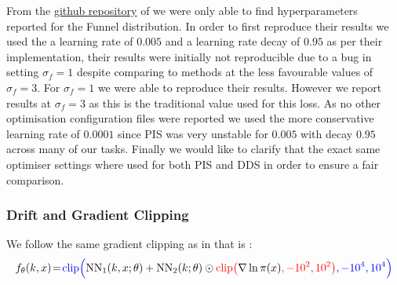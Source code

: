 \documentclass{article} %
\begin{document}
From the \href{https://github.com/qsh-zh/pis}{github repository} of \cite{zhangyongxinchen2021path} we were only able to find hyperparameters reported for the Funnel distribution. In order to first reproduce their results we used the a learning rate of $0.005$ and a learning rate decay of $0.95$ as per their implementation, their results were initially not reproducible due to a bug in setting $\sigma_f=1$ despite comparing to methods at the less favourable values of $\sigma_f=3$. For $\sigma_f=1$ we were able to reproduce their results. However we report results at $\sigma_f=3$ as this is the traditional value used for this loss. As no other optimisation configuration files were reported we used the more conservative learning rate of $0.0001$ since PIS was very unstable for $0.005$ with decay $0.95$ across many of our tasks. Finally we would like to clarify that the exact same optimiser settings where used for both PIS and DDS in order to ensure a fair comparison.

\subsubsection{Drift and Gradient Clipping}

We follow the same gradient clipping as in \cite{zhangyongxinchen2021path} that is :
\begin{align}
f_\theta(k, x) \!=\!\textcolor{blue}{ \mathrm{clip}\Big(}\mathrm{NN}_1(k, x;\theta) + \mathrm{NN}_2(k;\theta) \odot \textcolor{red}{\mathrm{clip}}\textcolor{red}{\big(}\nabla \ln  \pi(x)\textcolor{red}{,-10^2, 10^2 \big)}  \textcolor{blue}{, -10^4, 10^4  \Big)}
\end{align}
\end{document}
